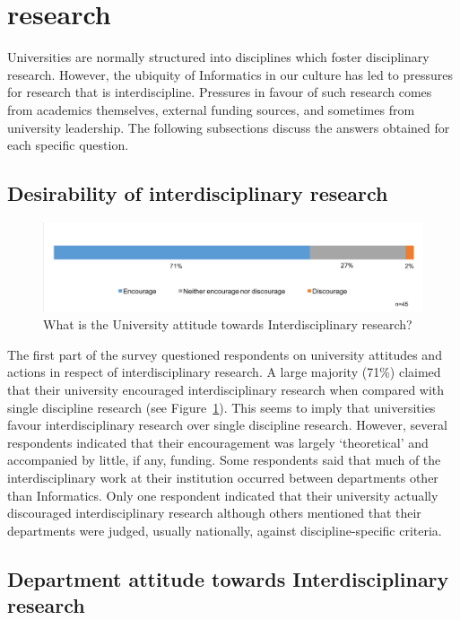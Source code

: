 \section{research}

Universities are normally structured into disciplines which foster disciplinary research. However, the ubiquity of Informatics in our culture has led to pressures for research that is interdiscipline. Pressures in favour of such research comes from academics themselves, external funding sources, and sometimes from university leadership. The 
following subsections discuss the answers obtained for each specific
question.

\subsection{Desirability of interdisciplinary research}

\begin{figure}[h]
\centering
\includegraphics[width = \linewidth]{charts/1a.png}
\caption{What is the University attitude towards Interdisciplinary research?}
\label{sect1:Uattitude}
\end{figure}

The first part of the survey questioned respondents on university attitudes and actions in respect of interdisciplinary research. A large majority (71\%) claimed that their university encouraged interdisciplinary research when compared with single discipline research (see Figure~\ref{sect1:Uattitude}). This seems to imply that universities favour interdisciplinary research over single discipline research.  However, several respondents indicated that their encouragement was largely `theoretical' and accompanied by little, if any, funding. Some respondents said that much of the interdisciplinary work at their institution occurred between departments other than Informatics. Only one respondent indicated that their university actually discouraged interdisciplinary research although others mentioned that their departments were judged, usually nationally, against discipline-specific criteria.

\subsection{Department attitude towards Interdisciplinary research}


